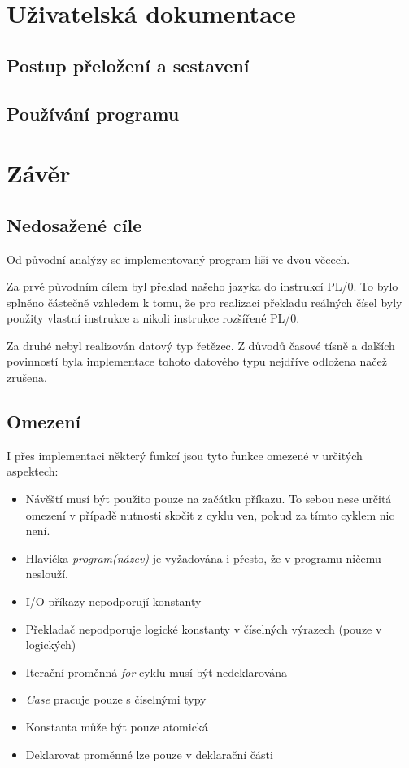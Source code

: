 \documentclass[
12pt,
a4paper,
pdftex,
czech,
titlepage
]{report}
\begin{document}
\chapter{Uživatelská dokumentace} 

\section{Postup přeložení a sestavení}

\section{Používání programu}

\chapter{Závěr}

\section{Nedosažené cíle}
Od původní analýzy se implementovaný program liší ve dvou věcech.

 Za prvé původním cílem byl překlad našeho jazyka do instrukcí PL/0. To bylo splněno částečně vzhledem k tomu, že pro realizaci překladu reálných čísel byly použity vlastní instrukce a nikoli instrukce rozšířené PL/0.
 
 Za druhé nebyl realizován datový typ řetězec. Z důvodů časové tísně a dalších povinností byla implementace tohoto datového typu nejdříve odložena načež zrušena. 

\section{Omezení}

I přes implementaci některý funkcí jsou tyto funkce omezené v určitých aspektech:

\begin{itemize}
\item Návěští musí být použito pouze na začátku příkazu. To sebou nese určitá omezení v případě nutnosti skočit z cyklu ven, pokud za tímto cyklem nic není.
\item Hlavička \textit{program(název)} je vyžadována i přesto, že v programu ničemu neslouží.
\item I/O příkazy nepodporují konstanty
\item Překladač nepodporuje logické konstanty v číselných výrazech (pouze v logických)
\item Iterační proměnná \textit{for} cyklu musí být nedeklarována
\item \textit{Case} pracuje pouze s číselnými typy
\item Konstanta může být pouze atomická
\item Deklarovat proměnné lze pouze v deklarační části
\end{itemize}
\end{document}
